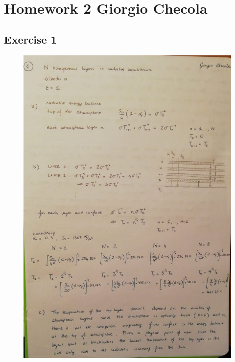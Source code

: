 \documentclass[11pt,a4paper]{article}
\begin{document}
	
\section*{Homework 2  \hfill Giorgio Checola}
\subsection{Exercise 1}
\begin{figure}[H]
	\centering 
	\includegraphics[width=150mm]{images/es1.JPEG}
\end{figure}
\end{document}
